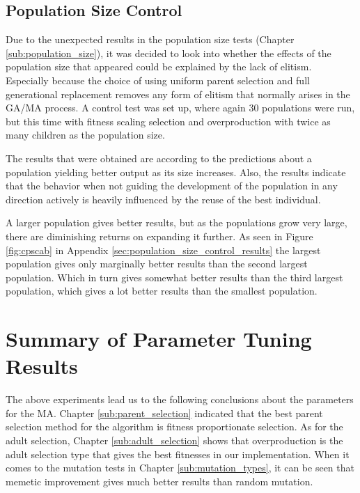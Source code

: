\subsection{Population Size Control} %
\label{sub:population_size_control}

Due to the unexpected results in the population size tests (Chapter \ref{sub:population_size}), it was decided to look into whether the effects of the population size that appeared could be explained by the lack of elitism. Especially because the choice of using uniform parent selection and full generational replacement removes any form of elitism that normally arises in the GA/MA process. A control test was set up, where again 30 populations were run, but this time with fitness scaling selection and overproduction with twice as many children as the population size.

The results that were obtained are according to the predictions about a population yielding better output as its size increases. Also, the results indicate that the behavior when not guiding the development of the population in any direction actively is heavily influenced by the reuse of the best individual. 

A larger population gives better results, but as the populations grow very large, there are diminishing returns on expanding it further. As seen in Figure \ref{fig:cpscab} in Appendix \ref{sec:population_size_control_results} the largest population gives only marginally better results than the second largest population. Which in turn gives somewhat better results than the third largest population, which gives a lot better results than the smallest population.

\section{Summary of Parameter Tuning Results} %
\label{sec:evaluation_and_conclusion}

The above experiments lead us to the following conclusions about the parameters for the MA. Chapter \ref{sub:parent_selection} indicated that the best parent selection method for the algorithm is fitness proportionate selection. As for the adult selection, Chapter \ref{sub:adult_selection} shows that overproduction is the adult selection type that gives the best fitnesses in our implementation. When it comes to the mutation tests in Chapter \ref{sub:mutation_types}, it can be seen that memetic improvement gives much better results than random mutation.

